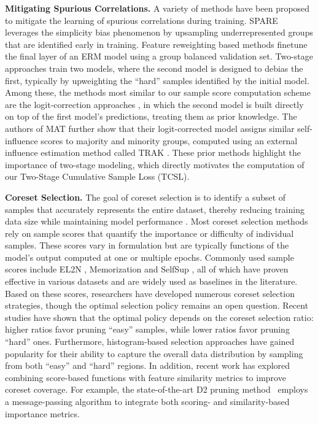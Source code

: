 \documentclass[letter,11pt]{article}
\begin{document}
\noindent \textbf{Mitigating Spurious Correlations.} A variety of methods have been proposed to mitigate the learning of spurious correlations during training. SPARE \citep{SPARE} leverages the simplicity bias phenomenon by upsampling underrepresented groups that are identified early in training. Feature reweighting based methods \citep{DFR, AFR} finetune the final layer of an ERM model using a group balanced validation set. Two-stage approaches \citep{JTT, LFF} train two models, where the second model is designed to debias the first, typically by upweighting the ``hard'' samples identified by the initial model. Among these, the methods most similar to our sample score computation scheme are the logit-correction approaches \citep{LC, uLA, MAT}, in which the second model is built directly on top of the first model’s predictions, treating them as prior knowledge. The authors of MAT \citep{MAT} further show that their logit-corrected model assigns similar self-influence scores to majority and minority groups, computed using an external influence estimation method called TRAK \citep{TRAK}. These prior methods highlight the importance of two-stage modeling, which directly motivates the computation of our Two-Stage Cumulative Sample Loss (TCSL).

\noindent \textbf{Coreset Selection.} The goal of coreset selection is to identify a subset of samples that accurately represents the entire dataset, thereby reducing training data size while maintaining model performance \citep{CS_LR}. Most coreset selection methods rely on sample scores that quantify the importance or difficulty of individual samples. These scores vary in formulation but are typically functions of the model’s output computed at one or multiple epochs. Commonly used sample scores include EL2N \citep{EL2N}, Memorization \citep{Memorization} and SelfSup \citep{SelfSup}, all of which have proven effective in various datasets and are widely used as baselines in the literature. Based on these scores, researchers have developed numerous coreset selection strategies, though the optimal selection policy remains an open question. Recent studies \citep{SelfSup, HistCS} have shown that the optimal policy depends on the coreset selection ratio: higher ratios favor pruning ``easy'' samples, while lower ratios favor pruning ``hard'' ones. Furthermore, histogram-based selection approaches \citep{HistCS} have gained popularity for their ability to capture the overall data distribution by sampling from both ``easy'' and ``hard'' regions. In addition, recent work has explored combining score-based functions with feature similarity metrics to improve coreset coverage. For example, the state-of-the-art D2 pruning method~\citep{D2} employs a message-passing algorithm to integrate both scoring- and similarity-based importance metrics.
\end{document}
